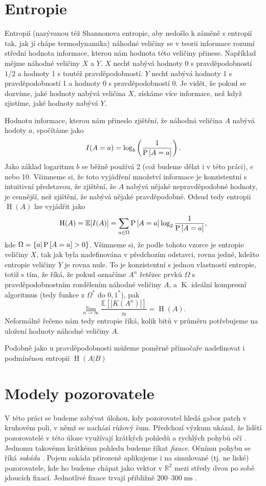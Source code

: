 \section{Entropie}

Entropií (nazývanou též Shannonova entropie, aby nedošlo k záměně s entropií
tak, jak jí chápe termodynamika) náhodné veličiny se v teorii informace rozumí
střední hodnota informace, kterou nám hodnota této veličiny přinese. Například
mějme náhodné veličiny $X$ a $Y$. $X$ nechť nabývá hodnoty 0 s pravděpodobností
$1/2$ a hodnoty 1 s toutéž pravděpodobností. $Y$ nechť nabývá hodnoty 1 s
pravděpodobností 1 a hodnoty 0 s pravděpodobností 0. Je vidět, že pokud se
dozvíme, jaké hodnoty nabývá veličina $X$, získáme více informace, než když
zjistíme, jaké hodnoty nabývá $Y$.
\def\H{\operatorname{H}}

Hodnotu informace, kterou nám přineslo zjištění, že náhodná veličina $A$ nabývá
hodoty $a$, spočítáme jako $$I(A=a)=\log_b\left(\frac1{\P{A=a}}\right).$$ Jako
základ logaritmu $b$ se běžně používá 2 (což budeme dělat i v této práci), $e$
nebo 10. Všimneme si, že toto vyjádření množství informace je konzistentní s
intuitivní představou, že zjištění, že $A$ nabývá nějaké nepravděpodobné
hodnoty, je cennější, než zjištění, že nabývá nějaké pravděpodobné. Odsud tedy
entropii $\H(A)$ lze vyjádřit jako $$\H(A)=\mathbb{E}[I(A)]=\displaystyle\sum_{a
\in \Omega}\P{A=a}\log_2\frac1{\P{A=a}},$$ kde $\Omega = \{a|\P{A=a} > 0\}$.
Všimneme si, že podle tohoto vzorce je entropie veličiny $X$, tak jak byla
nadefinována v předchozím odstavci, rovna jedné, kdežto  entropie veličiny $Y$
je rovna nule. To je konzistentní s jednou vlastností entropie, totiž s tím, že
říká, že pokud označíme $A^n$ řetězec prvků $\Omega$ s pravděpodobnostním
rozdělením náhodné veličiny $A$, a $\operatorname K$ ideální kompresní
algoritmus (tedy funkce z $\Omega^*$ do ${0,1}^*$), pak
$$\operatorname{lim}_{n\rightarrow\infty} \frac{\mathbb{E}[|K(A^n)|]}{n} =
\H(A).$$ Neformálně řečeno nám tedy entropie říká, kolik bitů v průměru
potřebujeme na uložení hodnoty náhodné veličiny $A$.

Podobně jako u pravděpodobnosti můžeme poměrně přímočaře nadefinovat i   
podmíněnou entropii $\H(A| B)$

\section{Modely pozorovatele}

V této práci se budeme zabývat úlohou, kdy pozorovatel hledá gabor patch v
kruhovém poli, v němž se nachází růžový šum. Předchozí výzkum ukázal, že lidští
pozorovatelé v této úloze využívají krátkých pohledů a rychlých pohybů očí \citep{Najemnik05}.
Jednomu takovému krátkému pohledu budeme říkat \emph{fixace}. Očnímu pohybu
se říká \emph{sakáda} \citep{sakady}. Pojem sakáda přirozeně aplikujeme i na simulované
(tj. ne liské) pozorovatele, kde ho budeme chápat jako vektor v $\mathbb{R}^2$
mezi středy dvou po sobě jdoucích fixací. Jednotlivé fixace trvají přibližně
$200$--$300 \operatorname{ms}$.


